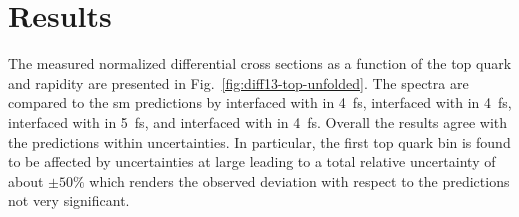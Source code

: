 
\section{Results}

The measured normalized differential cross sections as a function of the top quark \pt and rapidity are presented in Fig.~\ref{fig:diff13-top-unfolded}. The spectra are compared to the \gls{sm} predictions by \MGAMC interfaced with \PYTHIA in 4~\gls{fs}, \POWHEG interfaced with \PYTHIA in 4~\gls{fs}, \MGAMC interfaced with \PYTHIA in 5~\gls{fs}, and \MGAMC interfaced with \HERWIG in 4~\gls{fs}. Overall the results agree with the predictions within uncertainties. In particular, the first top quark \pt bin is found to be affected by uncertainties at large leading to a total relative uncertainty of about $\pm50\%$ which renders the observed deviation with respect to the predictions not very significant.

